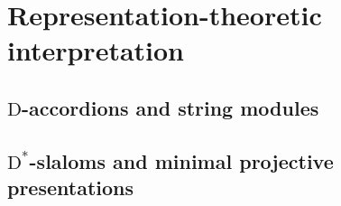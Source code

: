 \documentclass{amsart}
\theoremstyle{definition}
\newcommand{\dual}{^*} %
\newcommand{\dissection}{\mathrm{D}} %
\begin{document}
\section{Representation-theoretic interpretation}

\subsection{$\dissection$-accordions and string modules}

\subsection{$\dissection\dual$-slaloms and minimal projective presentations}




\label{sec:biblio}
\end{document}
